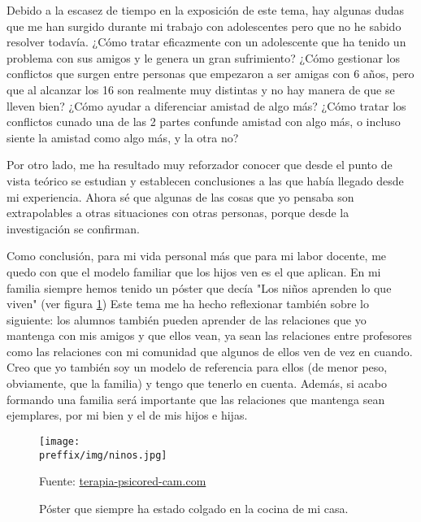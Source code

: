 Debido a la escasez de tiempo en la exposición de este tema, hay algunas dudas que me han surgido durante mi trabajo con adolescentes pero que no he sabido resolver todavía.
%
¿Cómo tratar eficazmente con un adolescente que ha tenido un problema con sus amigos y le genera un gran sufrimiento?
%
¿Cómo gestionar los conflictos que surgen entre personas que empezaron a ser amigas con 6 años, pero que al alcanzar los 16 son realmente muy distintas y no hay manera de que se lleven bien? 
%
¿Cómo ayudar a diferenciar amistad de algo más?
%
¿Cómo tratar los conflictos cunado una de las 2 partes confunde amistad con algo más, o incluso siente la amistad como algo más, y la otra no?

Por otro lado, me ha resultado muy reforzador conocer que desde el punto de vista teórico se estudian y establecen conclusiones a las que había llegado desde mi experiencia.
%
Ahora sé que algunas de las cosas que yo pensaba son extrapolables a otras situaciones con otras personas, porque desde la investigación se confirman.

Como conclusión, para mi vida personal más que para mi labor docente, me quedo con que el modelo familiar que los hijos ven es el que aplican.
%
En mi familia siempre hemos tenido un póster que decía "Los niños aprenden lo que viven" (ver figura \ref{img:ninos})
%
Este tema me ha hecho reflexionar también sobre lo siguiente:
%
los alumnos también pueden aprender de las relaciones que yo mantenga con mis amigos y que ellos vean, ya sean las relaciones entre profesores como las relaciones con mi comunidad que algunos de ellos ven de vez en cuando.
%
Creo que yo también soy un modelo de referencia para ellos (de menor peso, obviamente, que la familia) y tengo que tenerlo en cuenta.
%
Además, si acabo formando una familia será importante que las relaciones que mantenga sean ejemplares, por mi bien y el de mis hijos e hijas.


\begin{figure}[hbtp]
\centering
\caption{Póster que siempre ha estado colgado en la cocina de mi casa.}
\label{img:ninos}
\texttt{[image: \\preffix/img/ninos.jpg]}

\small{Fuente: \href{https://www.terapia-psicored-cam.com/psicoanalistas-articulos?lightbox=image3ht}{terapia-psicored-cam.com}}
\end{figure}



